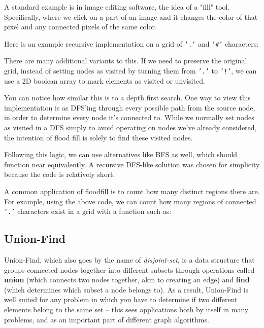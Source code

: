 A standard example is in image editing software, the idea of a "fill" tool. Specifically, where we click on a part of an image and it changes the color of that pixel and any connected pixels of the same color.

Here is an example recursive implementation on a grid of \texttt{'.'} and \texttt{'#'} characters:


There are many additional variants to this. If we need to preserve the original grid, instead of setting nodes as visited by turning them from \texttt{'.'} to \texttt{'!'}, we can use a 2D boolean array to mark elements as visited or unvisited.

You can notice how similar this is to a depth first search. One way to view this implementation is as DFS'ing through every possible path from the source node, in order to determine every node it's connected to. While we normally set nodes as visited in a DFS simply to avoid operating on nodes we've already considered, the intention of flood fill is solely to find these visited nodes.

Following this logic, we can use alternatives like BFS as well, which should function near equivalently. A recursive DFS-like solution was chosen for simplicity because the code is relatively short.

A common application of floodfill is to count how many distinct regions there are. For example, using the above code, we can count how many regions of connected \texttt{'.'} characters exist in a grid with a function such as:


\subsection{Union-Find}
  

Union-Find, which also goes by the name of \textit{disjoint-set}, is a data structure that groups connected nodes together into different subsets through operations called \textbf{union} (which connects two nodes together, akin to creating an edge) and \textbf{find} (which determines which subset a node belongs to). As a result, Union-Find is well suited for any problem in which you have to determine if two different elements belong to the same set -- this sees applications both by itself in many problems, and as an important part of different graph algorithms.

